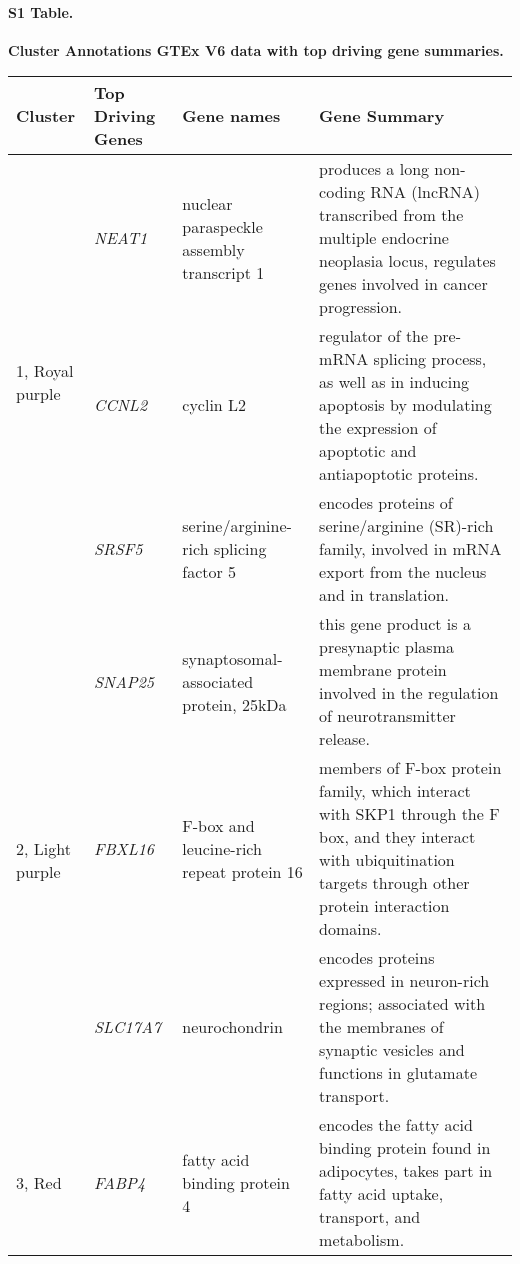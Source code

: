 \documentclass[10pt,letterpaper]{article}
\begin{document}
\paragraph*{S1 Table.}
\label{supptab1}
{\bf Cluster Annotations GTEx V6 data with top driving gene summaries.}

\begin{table}[!hp]
\begin{adjustwidth}{-.5in}{0in}
\begin{tabular}{|p{0.6in}|p{0.6in}|p{1.3 in}|p{3.8in}|}
\hline
Cluster & Top Driving \qquad Genes & Gene names  & Gene Summary \\
\hline
\multirow{3}{4em}{\scriptsize{1, Royal purple} } &  \small{\textit{NEAT1}} & \scriptsize{nuclear paraspeckle assembly transcript 1} & \scriptsize{produces a long non-coding RNA (lncRNA) transcribed from the multiple endocrine neoplasia locus, regulates genes involved in cancer progression.}\\
				& \small{\textit{CCNL2}} & \scriptsize{cyclin L2} & \scriptsize{regulator of the pre-mRNA splicing process, as well as in inducing apoptosis by modulating the expression of apoptotic and antiapoptotic proteins.}\\
				& \small{\textit{SRSF5}} & \scriptsize{serine/arginine-rich splicing factor 5} & \scriptsize{encodes proteins of serine/arginine (SR)-rich family,  involved in mRNA export from the nucleus and in translation.}\\
\hline
 \multirow{3}{4em}{\scriptsize{2, Light purple} } & \small{\textit{SNAP25}}  & \scriptsize{synaptosomal-associated protein, 25kDa} & \scriptsize{this gene product is a presynaptic plasma membrane protein involved in the regulation of neurotransmitter release.} \\
 					&  \small{\textit{FBXL16}}  & \scriptsize{F-box and leucine-rich repeat protein 16} & \scriptsize{members of F-box protein family, which interact with SKP1 through the F box, and they interact with ubiquitination targets through other protein interaction domains.} \\
					&  \small{\textit{SLC17A7}}  & \scriptsize{neurochondrin} & \scriptsize{encodes proteins expressed in neuron-rich regions; associated with the membranes of synaptic vesicles and functions in glutamate transport.} \\
\hline
 \multirow{3}{4em}{\scriptsize{3, Red} } & \small{\textit{FABP4}}  & \scriptsize{fatty acid binding protein 4} & \scriptsize{ encodes the fatty acid binding protein found in adipocytes, takes part in fatty acid uptake, transport, and metabolism.} \\

\end{tabular}
\end{adjustwidth}
\end{table}
\end{document}
